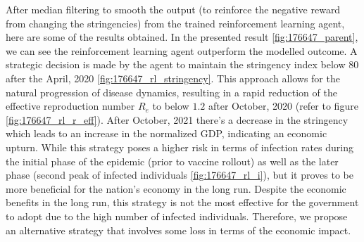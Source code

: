 \documentclass[tikz,fleqn,12pt]{wlscirep}
\begin{document}
After median filtering to smooth the output (to reinforce the negative reward from changing the stringencies) from the trained reinforcement learning agent, here are some of the results obtained. In the presented result \cref{fig:176647_parent}, we can see the reinforcement learning agent outperform the modelled outcome. A strategic decision is made by the agent to maintain the stringency index below 80 after the April, 2020 \cref{fig:176647_rl_stringency}. This approach allows for the natural progression of disease dynamics, resulting in a rapid reduction of the effective reproduction number $R_e$ to below $1.2$ after October, 2020 (refer to figure \cref{fig:176647_rl_r_eff}). After October, 2021 there's a decrease in the stringency which leads to an increase in the normalized GDP, indicating an economic upturn. While this strategy poses a higher risk in terms of infection rates during the initial phase of the epidemic (prior to vaccine rollout) as well as the later phase (second peak of infected individuals \cref{fig:176647_rl_i}), but it proves to be more beneficial for the nation's economy in the long run. Despite the economic benefits in the long run, this strategy is not the most effective for the government to adopt due to the high number of infected individuals. Therefore, we propose an alternative strategy that involves some loss in terms of the economic impact.
\end{document}
